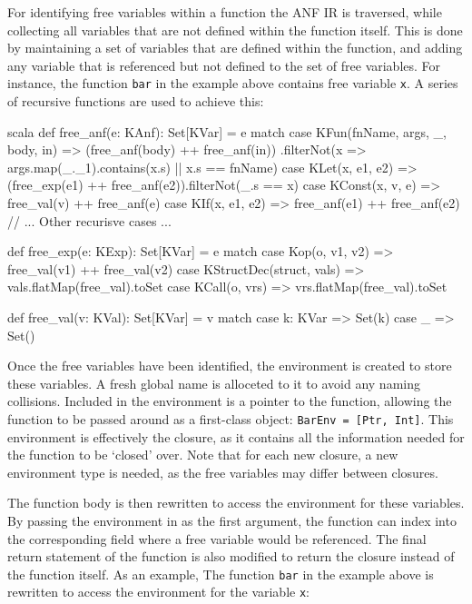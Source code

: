 For identifying free variables within a function the ANF IR is traversed, while collecting all
variables that are not defined within the function itself. This is done by maintaining a set of
variables that are defined within the function, and adding any variable that is referenced but not
defined to the set of free variables. For instance, the function \texttt{bar} in the example above
contains free variable \texttt{x}. A series of recursive functions are used to achieve this:

\begin{code}{scala}
    def free_anf(e: KAnf): Set[KVar] = e match {
        case KFun(fnName, args, _, body, in) =>
            (free_anf(body) ++ free_anf(in))
                .filterNot(x => args.map(_._1).contains(x.s) || x.s == fnName)
        case KLet(x, e1, e2) => (free_exp(e1) ++ free_anf(e2)).filterNot(_.s == x)
        case KConst(x, v, e) => free_val(v) ++ free_anf(e)
        case KIf(x, e1, e2) => free_anf(e1) ++ free_anf(e2)
        // ... Other recurisve cases ...
    }

    def free_exp(e: KExp): Set[KVar] = e match {
        case Kop(o, v1, v2) => free_val(v1) ++ free_val(v2)
        case KStructDec(struct, vals) => vals.flatMap(free_val).toSet
        case KCall(o, vrs) => vrs.flatMap(free_val).toSet
    }

    def free_val(v: KVal): Set[KVar] = v match {
        case k: KVar => Set(k)
        case _ => Set()
    }
\end{code}

Once the free variables have been identified, the environment is created to store these
variables. A fresh global name is alloceted to it to avoid any naming collisions.
Included in the environment is a pointer to the function, allowing the function to be passed around
as a first-class object:
\texttt{BarEnv = [Ptr, Int]}.
This environment is effectively the closure, as it contains all the information needed for the
function to be `closed' over. Note that for each new closure, a new environment type is needed, as
the free variables may differ between closures.

The function body is then rewritten to access the environment for these variables. By passing the
environment in as the first argument, the function can index into the corresponding field where a
free variable would be referenced. The final return statement of the function is also modified to
return the closure instead of the function itself. As an example, The function \texttt{bar} in the
example above is rewritten to access the environment for the variable \texttt{x}:

